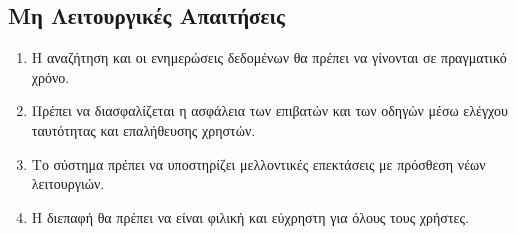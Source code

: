 \documentclass[11pt]{article}
\begin{document}
\subsection{Μη Λειτουργικές Απαιτήσεις}

\begin{enumerate}
    \item Η αναζήτηση και οι ενημερώσεις δεδομένων θα πρέπει να γίνονται σε πραγματικό χρόνο.
    \item Πρέπει να διασφαλίζεται η ασφάλεια των επιβατών και των οδηγών μέσω ελέγχου ταυτότητας
          και επαλήθευσης χρηστών.
    \item Το σύστημα πρέπει να υποστηρίζει μελλοντικές επεκτάσεις με πρόσθεση νέων λειτουργιών.
    \item Η διεπαφή θα πρέπει να είναι φιλική και εύχρηστη για όλους τους χρήστες.
\end{enumerate}

\newpage



\newpage





\end{document}
